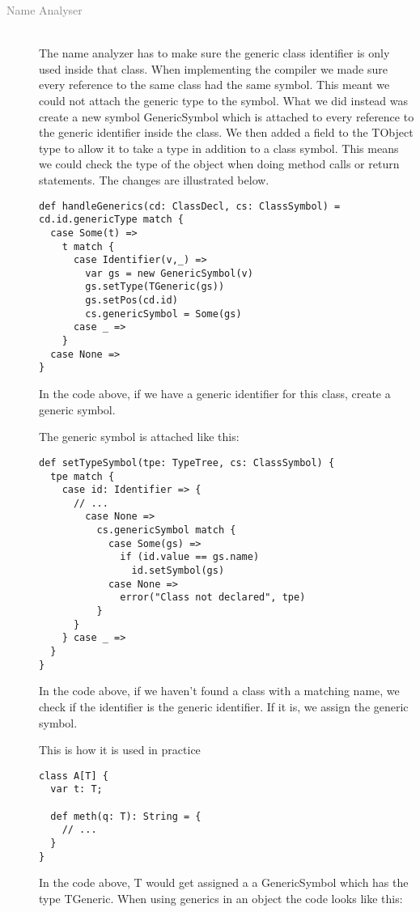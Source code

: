 \begin{description}
\item[\textcolor{Gray}{Name Analyser}] \hfill \\
The name analyzer has to make sure the generic class identifier is only used inside that class. When implementing the compiler we made sure every reference to the same class had the same symbol. This meant we could not attach the generic type to the symbol. What we did instead was create a new symbol GenericSymbol which is attached to every reference to the generic identifier inside the class. We then added a field to the TObject type to allow it to take a type in addition to a class symbol. This means we could check the type of the object when doing method calls or return statements. The changes are illustrated below.

\begin{lstlisting}
def handleGenerics(cd: ClassDecl, cs: ClassSymbol) =
cd.id.genericType match {
  case Some(t) =>
    t match {
      case Identifier(v,_) =>
        var gs = new GenericSymbol(v)
        gs.setType(TGeneric(gs))
        gs.setPos(cd.id)
        cs.genericSymbol = Some(gs)
      case _ =>
    }
  case None =>
}
\end{lstlisting}

In the code above, if we have a generic identifier for this class, create a generic symbol.

The generic symbol is attached like this:

\begin{lstlisting}
def setTypeSymbol(tpe: TypeTree, cs: ClassSymbol) {
  tpe match {
    case id: Identifier => {
      // ... 
        case None =>
          cs.genericSymbol match {
            case Some(gs) =>
              if (id.value == gs.name)
                id.setSymbol(gs)
            case None =>
              error("Class not declared", tpe)
          }
      }
    } case _ =>
  }
}
\end{lstlisting}

In the code above, if we haven't found a class with a matching name, we check if the identifier is the generic identifier. If it is, we assign the generic symbol.

This is how it is used in practice

\begin{lstlisting}
class A[T] {
  var t: T;

  def meth(q: T): String = {
    // ...
  }
}
\end{lstlisting}

In the code above, T would get assigned a a GenericSymbol which has the type TGeneric. When using generics in an object the code looks like this:


\end{description}
